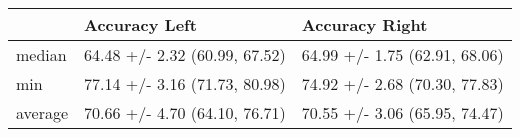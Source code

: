 \begin{tabular}{lll}
\toprule
{} &                  Accuracy Left &                 Accuracy Right \\
\midrule
median  &  64.48 +/- 2.32 (60.99, 67.52) &  64.99 +/- 1.75 (62.91, 68.06) \\
min     &  77.14 +/- 3.16 (71.73, 80.98) &  74.92 +/- 2.68 (70.30, 77.83) \\
average &  70.66 +/- 4.70 (64.10, 76.71) &  70.55 +/- 3.06 (65.95, 74.47) \\
\bottomrule
\end{tabular}
